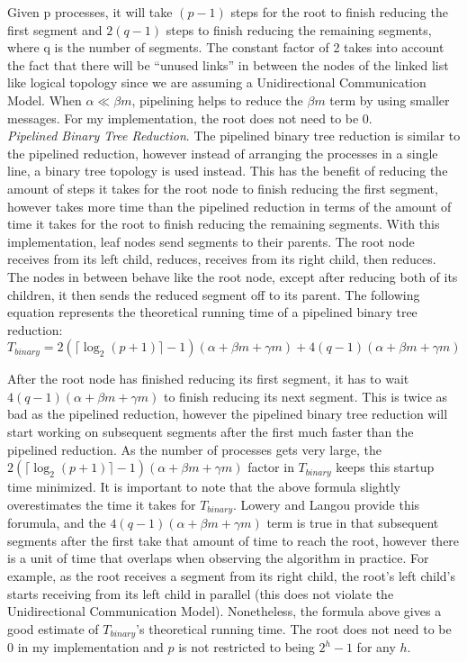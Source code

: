 \documentclass{article}
\begin{document}
\noindent Given p processes, it will take $(p-1)$ steps for the root to finish reducing the first 
segment and $2(q-1)$ steps to finish reducing the remaining segments, where q is the number of segments. 
The constant factor of 2 takes into account the fact that there will be “unused links” in between the nodes
of the linked list like logical topology since we are assuming a Unidirectional Communication Model. 
When $\alpha \ll \beta m$, pipelining helps to reduce the $\beta m$ term by using smaller messages. For my
implementation, the root does not need to be 0. \\

\textit{Pipelined Binary Tree Reduction}. The pipelined binary tree reduction is similar to the pipelined
reduction, however instead of arranging the processes in a single line, a binary tree topology is used
instead. This has the benefit of reducing the amount of steps it takes for the root node to finish reducing
the first segment, however takes more time than the pipelined reduction in terms of the amount of time it
takes for the root to finish reducing the remaining segments. With this implementation, leaf nodes send
segments to their parents. The root node receives from its left child, reduces, receives from its right 
child, then reduces. The nodes in between behave like the root node, except after reducing both of its 
children, it then sends the reduced segment off to its parent. The following equation represents the 
theoretical running time of a pipelined binary tree reduction:
$$T_{binary} = 2(\lceil \log_2{(p+1)} \rceil - 1)(\alpha + \beta m + \gamma m) +
4(q-1)(\alpha + \beta m + \gamma m)$$

\noindent After the root node has finished reducing its first segment, it has to wait 
$4(q-1)(\alpha + \beta m + \gamma m)$ to finish reducing its next segment. This is twice as bad as the 
pipelined reduction, however the pipelined binary tree reduction will start working on subsequent segments
after the first much faster than the pipelined reduction. As the number of processes gets very large, the 
$2(\lceil \log_2{(p+1)} \rceil - 1)(\alpha + \beta m + \gamma m)$ factor in $T_{binary}$ keeps this
startup time minimized. It is important to note that the above formula slightly overestimates the time
it takes for $T_{binary}$. Lowery and Langou \cite{Lowery-13} provide this forumula, and the $4(q-1)(\alpha
+ \beta m + \gamma m)$ term is true in that subsequent segments after the first take that amount of time 
to reach the root, however there is a unit of time that overlaps when observing the algorithm in practice.
For example, as the root receives a segment from its right child, the root's left child's starts 
receiving from its left child in parallel (this does not violate the Unidirectional Communication Model).
Nonetheless, the formula above gives a good estimate of $T_{binary}$'s theoretical running time. The
root does not need to be 0 in my implementation and $p$ is not restricted to being $2^h - 1$ for any $h$.\\
\end{document}
